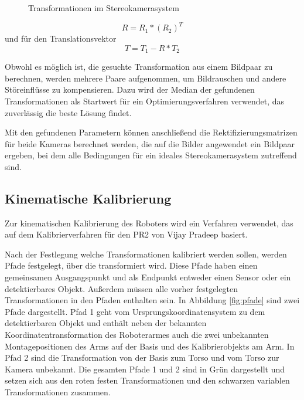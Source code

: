\begin{figure}[htpb] \centering \def\svgwidth{\textwidth}
   \caption{Transformationen im
  Stereokamerasystem} \label{fig:StereoTrans} \end{figure}


\begin{equation} R=R_1*(R_2)^T \end{equation} und für den Translationsvektor
\begin{equation} T=T_1-R*T_2 \end{equation}

Obwohl es möglich ist, die gesuchte Transformation aus einem Bildpaar zu
berechnen, werden mehrere Paare aufgenommen, um Bildrauschen und andere
Störeinflüsse zu kompensieren. Dazu wird der Median der gefundenen
Transformationen als Startwert für ein Optimierungsverfahren verwendet, das
zuverlässig die beste Lösung findet.

Mit den gefundenen Parametern können anschließend die Rektifizierungsmatrizen
für beide Kameras berechnet werden, die auf die Bilder angewendet ein Bildpaar
ergeben, bei dem alle Bedingungen für ein ideales Stereokamerasystem zutreffend
sind.\cite{Bradski2008}


\subsection{Kinematische Kalibrierung} %

\label{sub:Kinematische Kalibrierung}

Zur kinematischen Kalibrierung des Roboters wird ein Verfahren
verwendet, das auf dem Kalibrierverfahren für den PR2 von Vijay Pradeep basiert.\cite{Pradeep2010}

Nach der Festlegung welche Transformationen kalibriert werden sollen, werden
Pfade festgelegt, über die transformiert wird. Diese Pfade haben einen
gemeinsamen Ausgangspunkt und als Endpunkt entweder einen Sensor oder ein
detektierbares Objekt. Außerdem müssen alle vorher festgelegten
Transformationen in den Pfaden enthalten sein. In Abbildung \ref{fig:pfade}
sind zwei Pfade dargestellt. Pfad 1 geht vom Ursprungskoordinatensystem zu dem
detektierbaren Objekt und enthält neben der bekannten Koordinatentransformation
des Roboterarmes auch die zwei unbekannten Montagepositionen des Arms auf der
Basis und des Kalibrierobjekts am Arm. In Pfad 2 sind die Transformation von
der Basis zum Torso und vom Torso zur Kamera unbekannt. Die gesamten Pfade 1 und
2 sind in Grün dargestellt und setzen sich aus den roten festen Transformationen
und den schwarzen variablen Transformationen zusammen.

